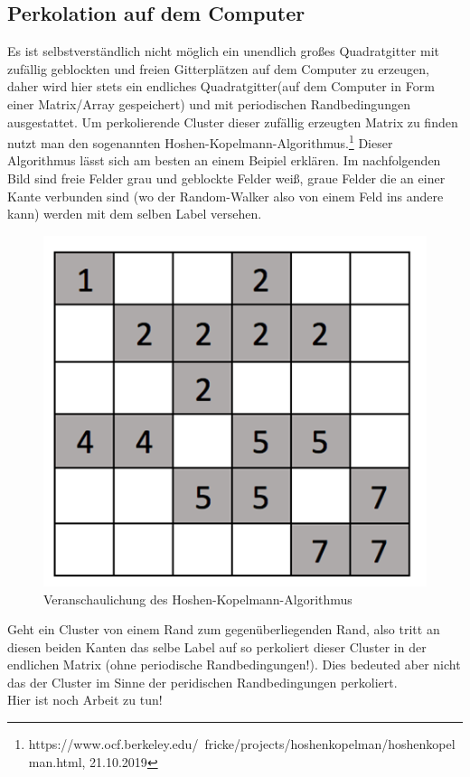 \documentclass[a4paper, 12pt]{scrartcl}
\begin{document}
\subsection{Perkolation auf dem Computer}
Es ist selbstverständlich nicht möglich ein unendlich großes Quadratgitter mit zufällig geblockten und freien Gitterplätzen auf dem Computer zu erzeugen, daher wird hier stets ein endliches Quadratgitter(auf dem Computer in Form einer Matrix/Array gespeichert) und mit periodischen Randbedingungen ausgestattet. Um perkolierende Cluster dieser zufällig erzeugten Matrix zu finden nutzt man den sogenannten Hoshen-Kopelmann-Algorithmus.\footnote{https://www.ocf.berkeley.edu/~fricke/projects/hoshenkopelman/hoshenkopelman.html, 21.10.2019}
Dieser Algorithmus lässt sich am besten an einem Beipiel erklären. Im nachfolgenden Bild sind freie Felder grau und geblockte Felder weiß, graue Felder die an einer Kante verbunden sind (wo der Random-Walker also von einem Feld ins andere kann) werden mit dem selben Label versehen.
\begin{figure}[h!]
\centering
\includegraphics[scale=0.5]{H-K_algorithm.png}
\caption{Veranschaulichung des Hoshen-Kopelmann-Algorithmus}
\end{figure}
\vspace{0,5cm}
\newpage
\noindent Geht ein Cluster von einem Rand zum gegenüberliegenden Rand, also tritt an diesen beiden Kanten das selbe Label auf so perkoliert dieser Cluster in der endlichen Matrix (ohne periodische Randbedingungen!). Dies bedeuted aber nicht das der Cluster im Sinne der peridischen Randbedingungen perkoliert. 
\\
Hier ist noch Arbeit zu tun!
\end{document}
